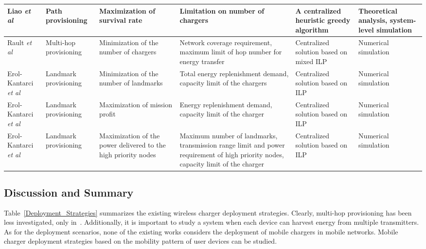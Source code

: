 \documentclass[twocolumn,10pt]{IEEEtran}
\begin{document}
\begin{table*}
\begin{tabular}{|p{1.4cm}|p{1.5cm}|p{4cm}|p{4cm}|p{2.1cm}|p{2.5cm}|}
\hline
 Liao \emph{et al} \cite{J.2014Liao}  &  Path provisioning &  Maximization of survival rate  & Limitation on number of chargers  & A centralized heuristic greedy algorithm  & Theoretical analysis, system-level simulation\\
\hline
  Rault \emph{et al}  \cite{T2013Rault}  & Multi-hop provisioning &  Minimization of the number of chargers & Network coverage requirement,   maximum  limit of hop number for energy transfer & Centralized solution based on mixed ILP & Numerical simulation \\
\hline
 Erol-Kantarci \emph{et al} \cite{Erol-Kantarci2012Suresense}  &  Landmark  provisioning & Minimization of the number of landmarks & Total energy replenishment demand, capacity limit of the chargers & Centralized solution based on ILP &  Numerical simulation \\
\hline
 Erol-Kantarci \emph{et al} \cite{M2012Erol-Kantarci} & Landmark  provisioning & Maximization of mission profit & Energy replenishment demand, capacity limit of the charger  & Centralized solution based on ILP &  Numerical simulation \\
\hline
 Erol-Kantarci \emph{et al} \cite{Erol-Kantarci2012DRIFT} & Landmark  provisioning & Maximization of the power delivered to the high priority nodes & Maximum number of landmarks, transmission range limit and power requirement of high priority nodes, capacity limit of the charger  & Centralized solution based on ILP &  Numerical simulation \\
\hline
\end{tabular}
\end{table*} 
 
\subsection{Discussion and Summary}



 
Table~\ref{Deployment_Strategies} summarizes the existing wireless charger deployment strategies. Clearly, multi-hop provisioning has been less investigated, only in~\cite{T2013Rault}. Additionally, it is important to study a system when each device can harvest energy from multiple transmitters. As for the deployment scenarios, none of the existing works considers the deployment of mobile chargers in mobile networks. Mobile charger deployment strategies based on the mobility pattern of user devices can be studied. 
\end{document}
